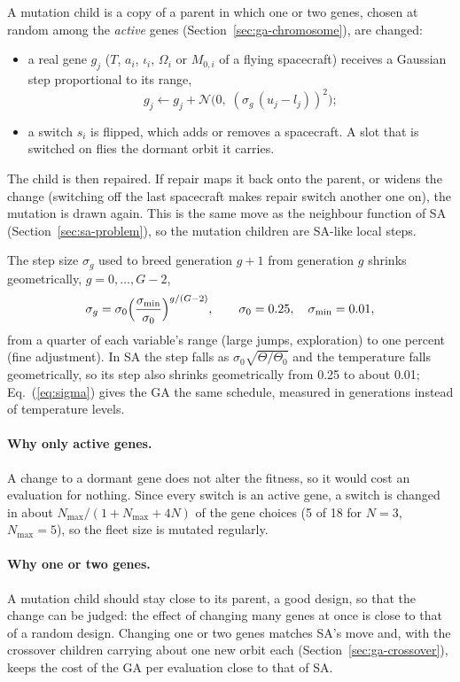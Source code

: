 A mutation child is a copy of a parent in which one or two genes, chosen at random among the
\emph{active} genes (Section~\ref{sec:ga-chromosome}), are changed:
\begin{itemize}
  \item a real gene $g_j$ ($T$, $a_i$, $\iota_i$, $\Omega_i$ or $M_{0,i}$ of a flying spacecraft)
        receives a Gaussian step proportional to its range,
        \begin{equation}
        g_j\leftarrow g_j+\mathcal{N}\!\bigl(0,\;(\sigma_g\,(u_j-l_j))^2\bigr);
        \label{eq:mutation}
        \end{equation}
  \item a switch $s_i$ is flipped, which adds or removes a spacecraft. A slot that is switched on
        flies the dormant orbit it carries.
\end{itemize}
The child is then repaired. If repair maps it back onto the parent, or widens the change (switching
off the last spacecraft makes repair switch another one on), the mutation is drawn again. This is
the same move as the neighbour function of \ac{SA} (Section~\ref{sec:sa-problem}), so the mutation
children are \ac{SA}-like local steps.

The step size $\sigma_g$ used to breed generation $g+1$ from generation $g$ shrinks geometrically,
$g=0,\dots,G-2$,
\begin{equation}
\sigma_g=\sigma_0\Bigl(\frac{\sigma_{\min}}{\sigma_0}\Bigr)^{g/(G-2)},\qquad
\sigma_0=0.25,\quad \sigma_{\min}=0.01,
\label{eq:sigma}
\end{equation}
from a quarter of each variable's range (large jumps, exploration) to one percent (fine
adjustment). In \ac{SA} the step falls as $\sigma_0\sqrt{\Theta/\Theta_0}$ and the temperature falls
geometrically, so its step also shrinks geometrically from 0.25 to about 0.01; Eq.~(\ref{eq:sigma})
gives the \ac{GA} the same schedule, measured in generations instead of temperature levels.

\paragraph{Why only active genes.} A change to a dormant gene does not alter the fitness, so it
would cost an evaluation for nothing. Since every switch is an active gene, a switch is changed in
about $N_{\max}/(1+N_{\max}+4N)$ of the gene choices (5 of 18 for $N=3$, $N_{\max}=5$), so the
fleet size is mutated regularly.

\paragraph{Why one or two genes.} A mutation child should stay close to its parent, a good design,
so that the change can be judged: the effect of changing many genes at once is close to that of a
random design. Changing one or two genes matches \ac{SA}'s move and, with the crossover children
carrying about one new orbit each (Section~\ref{sec:ga-crossover}), keeps the cost of the
\ac{GA} per evaluation close to that of \ac{SA}.

